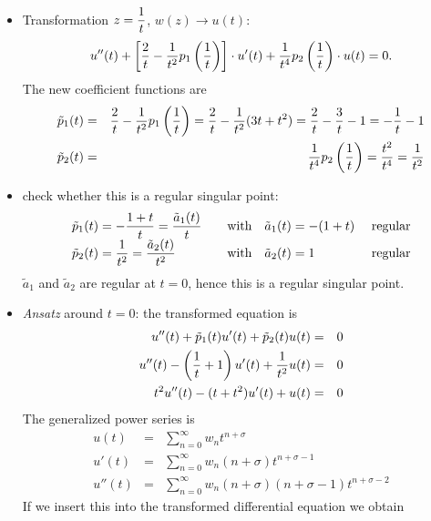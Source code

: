 {\begin{enumerate}
\begin{itemize}
\item Transformation $\displaystyle z={1\over t}$, $w(z)\to u(t)$:
      $$
         u''(t)+\left[{2\over t}-{1\over t^2}p_1\left({1\over t}\right)
         \right]\cdot u'(t)+{1\over t^4}p_2\left({1\over t}\right)\cdot
         u(t)=0.
      $$
      The new coefficient functions are
      \begin{eqnarray*}
         \tilde p_1(t)&=&{2\over t}-{1\over t^2}p_1\left({1\over t}\right)=
                         {2\over t}-{1\over t^2}(3t+t^2)={2\over t}
                         -{3\over t}-1=-{1\over t}-1\\
         \tilde p_2(t)&=&{1\over t^4}p_2\left({1\over t}\right)=
                         {t^2\over t^4}={1\over t^2}
      \end{eqnarray*}
\item check whether this is a  regular singular point:
      $$
         \begin{array}{lll}
            \displaystyle \tilde p_1(t)=-{1+t\over t}={\tilde a_1(t)\over t} &
            ~~\mbox{ with }~~\tilde a_1(t)=-(1+t)&~\mbox{regular}\\
            \displaystyle \tilde p_2(t)={1\over t^2}={\tilde a_2(t)\over t^2} &
            ~~\mbox{ with }~~\tilde a_2(t)=1&~\mbox{regular}
         \end{array}
      $$
      $\tilde a_1$ and $\tilde a_2$ are regular at $t=0$, hence  this is a  regular singular point.
\item {\it Ansatz} around $t=0$:
the transformed equation is
      \begin{eqnarray*}
         u''(t)+\tilde p_1(t)u'(t)+\tilde p_2(t)u(t)&=&0\\
         u''(t)-\left({1\over t}+1\right)u'(t)+{1\over t^2}u(t)&=&0\\
         t^2 u''(t)-(t+t^2)u'(t)+u(t)&=&0
      \end{eqnarray*}
      The generalized power series is
      \begin{eqnarray*}
         u(t)  &=&\sum_{n=0}^\infty w_n t^{n+\sigma}\\
         u'(t) &=&\sum_{n=0}^\infty w_n (n+\sigma)t^{n+\sigma-1}\\
         u''(t)&=&\sum_{n=0}^\infty w_n (n+\sigma)(n+\sigma-1)
                  t^{n+\sigma-2}
      \end{eqnarray*}
      If we insert this into the transformed differential equation we obtain
      \begin{equation*}

\end{equation*}
\end{itemize}
\end{enumerate}}
